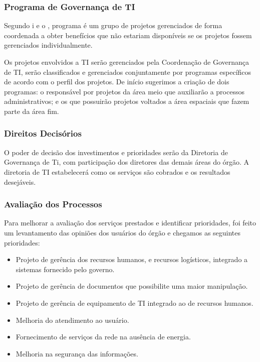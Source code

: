 \subsubsection{Programa de Governança de TI}

Segundo  \cite{ImplantandoGTI:2012}i e o \cite{PMBOK/PMI:2013}, programa é um grupo de projetos gerenciados de forma coordenada a obter benefícios que não estariam disponíveis se os projetos fossem gerenciados individualmente.

Os projetos envolvidos a TI serão gerenciados pela Coordenação de Governança de TI, serão classificados e gerenciados conjuntamente por programas específicos de acordo com o perfil dos projetos. De início sugerimos a criação de dois programas: o responsável por projetos da área meio que auxiliarão a processos administrativos; e os que possuirão projetos voltados a área espaciais que fazem parte da área fim.

\subsubsection{Direitos Decisórios}

O poder de decisão dos investimentos e prioridades serão da Diretoria de Governança de Ti, com participação dos diretores das demais áreas do órgão.  A diretoria de TI estabelecerá como os serviços são cobrados e os resultados desejáveis.

\subsubsection{Avaliação dos Processos}

Para melhorar a avaliação dos serviços prestados e identificar prioridades, foi feito um levantamento das opiniões dos usuários do órgão e chegamos as seguintes prioridades:

\begin{itemize}
\item Projeto de gerência dos recursos humanos, e recursos logísticos, integrado a sistemas fornecido pelo governo.
\item Projeto de gerência de documentos que possibilite uma maior manipulação.
\item Projeto de gerência de equipamento de TI integrado ao de recursos humanos.
\item Melhoria do atendimento ao usuário.
\item Fornecimento de serviços da rede na ausência de energia.
\item Melhoria na segurança das informações.
\end{itemize}

